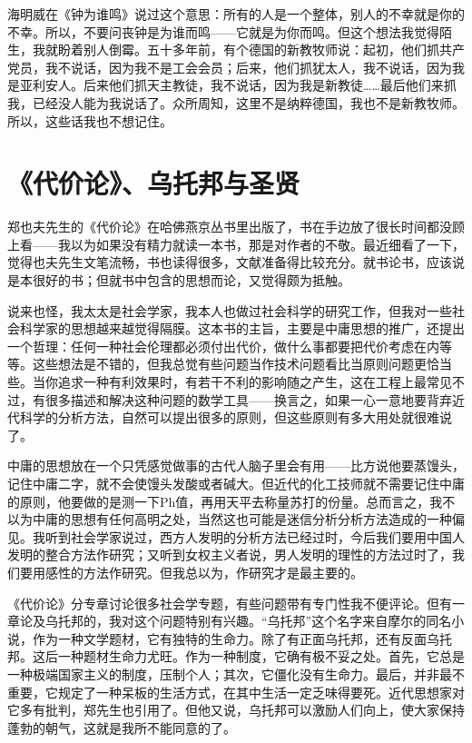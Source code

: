 海明威在《钟为谁鸣》说过这个意思：所有的人是一个整体，别人的不幸就是你的不幸。所以，不要问丧钟是为谁而鸣——它就是为你而鸣。但这个想法我觉得陌生，我就盼着别人倒霉。五十多年前，有个德国的新教牧师说：起初，他们抓共产党员，我不说话，因为我不是工会会员；后来，他们抓犹太人，我不说话，因为我是亚利安人。后来他们抓天主教徒，我不说话，因为我是新教徒……最后他们来抓我，已经没人能为我说话了。众所周知，这里不是纳粹德国，我也不是新教牧师。所以，这些话我也不想记住。

\chapter{《代价论》、乌托邦与圣贤}

郑也夫先生的《代价论》在哈佛燕京丛书里出版了，书在手边放了很长时间都没顾上看——我以为如果没有精力就读一本书，那是对作者的不敬。最近细看了一下，觉得也夫先生文笔流畅，书也读得很多，文献准备得比较充分。就书论书，应该说是本很好的书；但就书中包含的思想而论，又觉得颇为抵触。 

说来也怪，我太太是社会学家，我本人也做过社会科学的研究工作，但我对一些社会科学家的思想越来越觉得隔膜。这本书的主旨，主要是中庸思想的推广，还提出一个哲理：任何一种社会伦理都必须付出代价，做什么事都要把代价考虑在内等等。这些想法是不错的，但我总觉有些问题当作技术问题看比当原则问题更恰当些。当你追求一种有利效果时，有若干不利的影响随之产生，这在工程上最常见不过，有很多描述和解决这种问题的数学工具——换言之，如果一心一意地要背弃近代科学的分析方法，自然可以提出很多的原则，但这些原则有多大用处就很难说了。 

中庸的思想放在一个只凭感觉做事的古代人脑子里会有用——比方说他要蒸馒头，记住中庸二字，就不会使馒头发酸或者碱大。但近代的化工技师就不需要记住中庸的原则，他要做的是测一下Ph值，再用天平去称量苏打的份量。总而言之，我不以为中庸的思想有任何高明之处，当然这也可能是迷信分析分析方法造成的一种偏见。我听到社会学家说过，西方人发明的分析方法已经过时，今后我们要用中国人发明的整合方法作研究；又听到女权主义者说，男人发明的理性的方法过时了，我们要用感性的方法作研究。但我总以为，作研究才是最主要的。 

《代价论》分专章讨论很多社会学专题，有些问题带有专门性我不便评论。但有一章论及乌托邦的，我对这个问题特别有兴趣。“乌托邦”这个名字来自摩尔的同名小说，作为一种文学题材，它有独特的生命力。除了有正面乌托邦，还有反面乌托邦。这后一种题材生命力尤旺。作为一种制度，它确有极不妥之处。首先，它总是一种极端国家主义的制度，压制个人；其次，它僵化没有生命力。最后，并非最不重要，它规定了一种呆板的生活方式，在其中生活一定乏味得要死。近代思想家对它多有批判，郑先生也引用了。但他又说，乌托邦可以激励人们向上，使大家保持蓬勃的朝气，这就是我所不能同意的了。 


